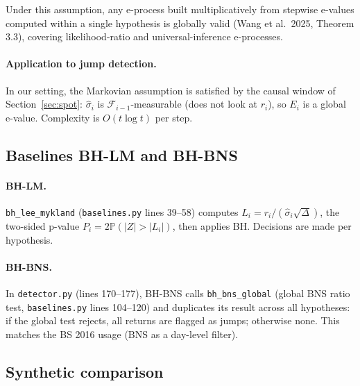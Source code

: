 \documentclass[11pt,a4paper]{article}
\theoremstyle{plain}
\theoremstyle{definition}
\theoremstyle{remark}
\newcommand{\Prob}{\mathbb{P}}
\newcommand{\dt}{\Delta}
\begin{document}
Under this assumption, any e-process built multiplicatively from stepwise
e-values computed within a single hypothesis is globally valid (Wang et
al.\ 2025, Theorem 3.3), covering likelihood-ratio and universal-inference
e-processes.

\paragraph{Application to jump detection.}
In our setting, the Markovian assumption is satisfied by the causal window
of Section~\ref{sec:spot}: $\hat{\sigma}_i$ is $\mathcal{F}_{i-1}$-measurable
(does not look at $r_i$), so $E_i$ is a global e-value. Complexity is
$O(t \log t)$ per step.

\subsection{Baselines BH-LM and BH-BNS}

\paragraph{BH-LM.}
\texttt{bh\_lee\_mykland} (\texttt{baselines.py} lines 39--58) computes
$L_i = r_i / (\hat{\sigma}_i\sqrt{\dt})$, the two-sided p-value
$P_i = 2\Prob(|Z| > |L_i|)$, then applies BH. Decisions are made per
hypothesis.

\paragraph{BH-BNS.}
In \texttt{detector.py} (lines 170--177), BH-BNS calls
\texttt{bh\_bns\_global} (global BNS ratio test, \texttt{baselines.py}
lines 104--120) and duplicates its result across all hypotheses: if the
global test rejects, all returns are flagged as jumps; otherwise none. This
matches the BS 2016 usage (BNS as a day-level filter).

\subsection{Synthetic comparison}
\end{document}
